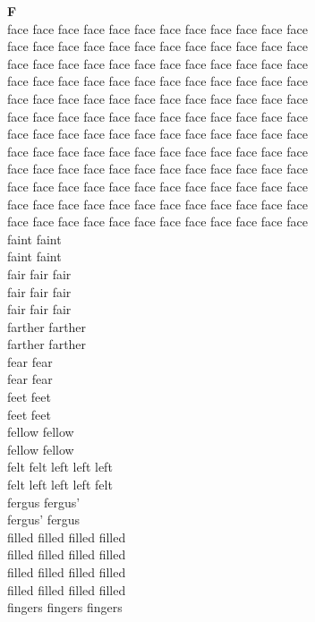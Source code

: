 \vspace{14pt}
\noindent\textbf{\Large F}\\[+12pt]
face face face face face face face face face face face face\\
face face face face face face face face face face face face\\
face face face face face face face face face face face face\\
face face face face face face face face face face face face\\
face face face face face face face face face face face face\\
face face face face face face face face face face face face\\
face face face face face face face face face face face face\\
face face face face face face face face face face face face\\
face face face face face face face face face face face face\\
face face face face face face face face face face face face\\
face face face face face face face face face face face face\\
face face face face face face face face face face face face\\
faint faint\\
faint faint\\
fair fair fair\\
fair fair fair\\
fair fair fair\\
farther farther\\
farther farther\\
fear fear\\
fear fear\\
feet feet\\
feet feet\\
fellow fellow\\
fellow fellow\\
felt felt left left left\\
felt left left left felt\\
fergus fergus'\\
fergus' fergus\\
filled filled filled filled\\
filled filled filled filled\\
filled filled filled filled\\
filled filled filled filled\\
fingers fingers fingers\\
